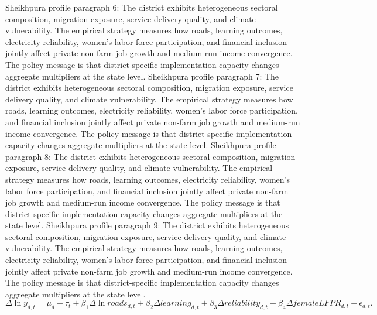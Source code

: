 \documentclass[preprint,12pt]{elsarticle}
\begin{document}
Sheikhpura profile paragraph 6: The district exhibits heterogeneous sectoral composition, migration exposure, service delivery quality, and climate vulnerability. The empirical strategy measures how roads, learning outcomes, electricity reliability, women's labor force participation, and financial inclusion jointly affect private non-farm job growth and medium-run income convergence. The policy message is that district-specific implementation capacity changes aggregate multipliers at the state level.
Sheikhpura profile paragraph 7: The district exhibits heterogeneous sectoral composition, migration exposure, service delivery quality, and climate vulnerability. The empirical strategy measures how roads, learning outcomes, electricity reliability, women's labor force participation, and financial inclusion jointly affect private non-farm job growth and medium-run income convergence. The policy message is that district-specific implementation capacity changes aggregate multipliers at the state level.
Sheikhpura profile paragraph 8: The district exhibits heterogeneous sectoral composition, migration exposure, service delivery quality, and climate vulnerability. The empirical strategy measures how roads, learning outcomes, electricity reliability, women's labor force participation, and financial inclusion jointly affect private non-farm job growth and medium-run income convergence. The policy message is that district-specific implementation capacity changes aggregate multipliers at the state level.
Sheikhpura profile paragraph 9: The district exhibits heterogeneous sectoral composition, migration exposure, service delivery quality, and climate vulnerability. The empirical strategy measures how roads, learning outcomes, electricity reliability, women's labor force participation, and financial inclusion jointly affect private non-farm job growth and medium-run income convergence. The policy message is that district-specific implementation capacity changes aggregate multipliers at the state level.
\begin{equation}\Delta \ln y_{d,t}=\mu_d+\tau_t+\beta_1\Delta\ln roads_{d,t}+\beta_2\Delta learning_{d,t}+\beta_3\Delta reliability_{d,t}+\beta_4\Delta femaleLFPR_{d,t}+\epsilon_{d,t}.\end{equation}
\end{document}

